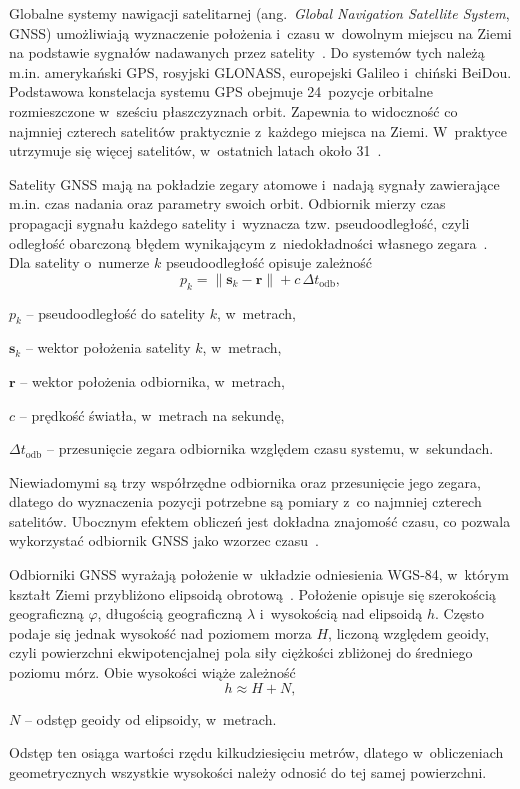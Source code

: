 \label{sec:gnss}
Globalne systemy nawigacji satelitarnej (ang.~\textit{Global Navigation Satellite System}, GNSS) umożliwiają wyznaczenie położenia i~czasu w~dowolnym miejscu na Ziemi na podstawie sygnałów nadawanych przez satelity~\cite{hofmann2008}. Do systemów tych należą m.in. amerykański GPS, rosyjski GLONASS, europejski Galileo i~chiński BeiDou. Podstawowa konstelacja systemu GPS obejmuje 24~pozycje orbitalne rozmieszczone w~sześciu płaszczyznach orbit. Zapewnia to widoczność co najmniej czterech satelitów praktycznie z~każdego miejsca na Ziemi. W~praktyce utrzymuje się więcej satelitów, w~ostatnich latach około 31~\cite{gpsgov_space}.

Satelity GNSS mają na pokładzie zegary atomowe i~nadają sygnały zawierające m.in. czas nadania oraz parametry swoich orbit. Odbiornik mierzy czas propagacji sygnału każdego satelity i~wyznacza tzw. pseudoodległość, czyli odległość obarczoną błędem wynikającym z~niedokładności własnego zegara~\cite{hofmann2008}.
Dla satelity o~numerze $k$ pseudoodległość opisuje zależność~\cite{hofmann2008}
\begin{equation}
  p_k = \lVert \boldsymbol{s}_k - \boldsymbol{r} \rVert + c\,\Delta t_{\mathrm{odb}},
  \label{eq:pseudoodleglosc}
\end{equation}
\begin{gdzie}
  \item $p_k$ -- pseudoodległość do satelity $k$, w~metrach,
  \item $\boldsymbol{s}_k$ -- wektor położenia satelity $k$, w~metrach,
  \item $\boldsymbol{r}$ -- wektor położenia odbiornika, w~metrach,
  \item $c$ -- prędkość światła, w~metrach na sekundę,
  \item $\Delta t_{\mathrm{odb}}$ -- przesunięcie zegara odbiornika względem czasu systemu, w~sekundach.
\end{gdzie}
Niewiadomymi są trzy współrzędne odbiornika oraz przesunięcie jego zegara, dlatego do wyznaczenia pozycji potrzebne są pomiary z~co najmniej czterech satelitów. Ubocznym efektem obliczeń jest dokładna znajomość czasu, co pozwala wykorzystać odbiornik GNSS jako wzorzec czasu~\cite{hofmann2008}.

Odbiorniki GNSS wyrażają położenie w~układzie odniesienia WGS-84, w~którym kształt Ziemi przybliżono elipsoidą obrotową~\cite{wgs84}. Położenie opisuje się szerokością geograficzną $\varphi$, długością geograficzną $\lambda$ i~wysokością nad elipsoidą $h$. Często podaje się jednak wysokość nad poziomem morza $H$, liczoną względem geoidy, czyli powierzchni ekwipotencjalnej pola siły ciężkości zbliżonej do średniego poziomu mórz. Obie wysokości wiąże zależność~\cite{hofmann2008}
\begin{equation}
  h \approx H + N,
  \label{eq:wysokosci}
\end{equation}
\begin{gdzie}
  \item $N$ -- odstęp geoidy od elipsoidy, w~metrach.
\end{gdzie}
Odstęp ten osiąga wartości rzędu kilkudziesięciu metrów, dlatego w~obliczeniach geometrycznych wszystkie wysokości należy odnosić do tej samej powierzchni.

